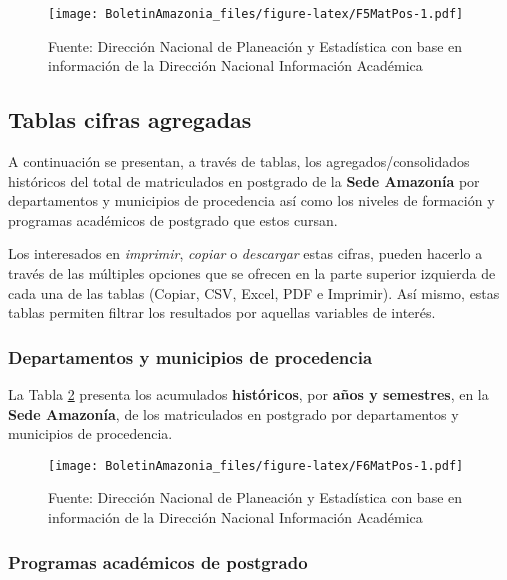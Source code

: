 \documentclass[
]{book}
\begin{document}
\begin{figure}
\centering
\texttt{[image: BoletinAmazonia\_files/figure-latex/F5MatPos-1.pdf]}
\caption{\label{fig:F5MatPos}Fuente: Dirección Nacional de Planeación y Estadística con base en información de la Dirección Nacional Información Académica}
\end{figure}

\hypertarget{tablas-cifras-agregadas-7}{%
\subsection{Tablas cifras agregadas}\label{tablas-cifras-agregadas-7}}

A continuación se presentan, a través de tablas, los agregados/consolidados históricos del total de matriculados en postgrado de la \textbf{Sede Amazonía} por departamentos y municipios de procedencia así como los niveles de formación y programas académicos de postgrado que estos cursan.

Los interesados en \emph{imprimir}, \emph{copiar} o \emph{descargar} estas cifras, pueden hacerlo a través de las múltiples opciones que se ofrecen en la parte superior izquierda de cada una de las tablas (Copiar, CSV, Excel, PDF e Imprimir). Así mismo, estas tablas permiten filtrar los resultados por aquellas variables de interés.

\hypertarget{departamentos-y-municipios-de-procedencia-5}{%
\subsubsection{Departamentos y municipios de procedencia}\label{departamentos-y-municipios-de-procedencia-5}}

La Tabla \ref{fig:F6MatPos} presenta los acumulados \textbf{históricos}, por \textbf{años y semestres}, en la \textbf{Sede Amazonía}, de los matriculados en postgrado por departamentos y municipios de procedencia.

\begin{figure}
\centering
\texttt{[image: BoletinAmazonia\_files/figure-latex/F6MatPos-1.pdf]}
\caption{\label{fig:F6MatPos}Fuente: Dirección Nacional de Planeación y Estadística con base en información de la Dirección Nacional Información Académica}
\end{figure}

\hypertarget{programas-acaduxe9micos-de-postgrado}{%
\subsubsection{Programas académicos de postgrado}\label{programas-acaduxe9micos-de-postgrado}}
\end{document}
